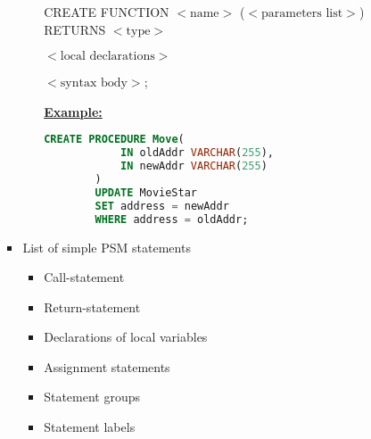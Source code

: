 \documentclass[12pt]{article}
\begin{document}
\begin{enumerate}[1.]
\begin{enumerate}[a)]
\begin{itemize}
\begin{itemize}
                \bigskip

                CREATE FUNCTION $<\text{name}>$ ($<\text{parameters list}>$) RETURNS $<\text{type}>$

                    $<\text{local declarations}>$

                    $<\text{syntax body}>$;

                \bigskip

                \underline{\textbf{Example:}}

                \bigskip

        \begin{lstlisting}[language=SQL]
        CREATE PROCEDURE Move(
            IN oldAddr VARCHAR(255),
            IN newAddr VARCHAR(255)
        )
        UPDATE MovieStar
        SET address = newAddr
        WHERE address = oldAddr;
        \end{lstlisting}

            \end{itemize}

            \item List of simple PSM statements
            \begin{itemize}
                \item Call-statement
                \item Return-statement
                \item Declarations of local variables
                \item Assignment statements
                \item Statement groups
                \item Statement labels
            \end{itemize}

        \end{itemize}

    \end{enumerate}
\end{enumerate}
\end{document}
